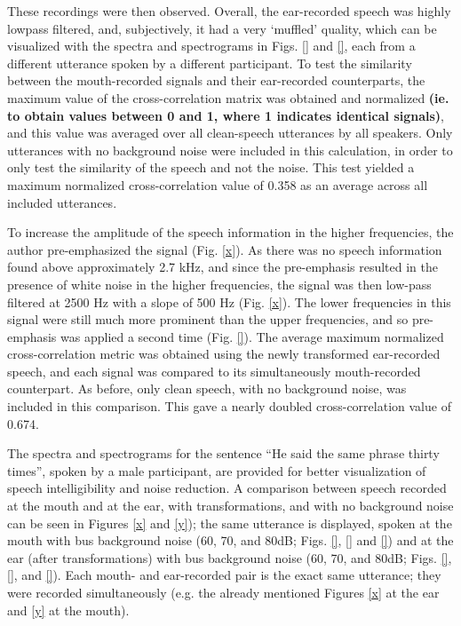 These recordings were then observed.  Overall, the ear-recorded speech was highly lowpass filtered, and, subjectively, it had a very `muffled' quality, which can be visualized with the spectra and spectrograms in Figs. \ref{} and \ref{}, each from a different utterance spoken by a different participant.  To test the similarity between the mouth-recorded signals and their ear-recorded counterparts, the maximum value of the cross-correlation matrix was obtained and normalized \textbf{(ie. to obtain values between 0 and 1, where 1 indicates identical signals)}, and this value was averaged over all clean-speech utterances by all speakers.  Only utterances with no background noise were included in this calculation, in order to only test the similarity of the speech and not the noise.  This test yielded a maximum normalized cross-correlation value of 0.358 as an average across all included utterances.

To increase the amplitude of the speech information in the higher frequencies, the author pre-emphasized the signal (Fig. \ref{x}).  As there was no speech information found above approximately 2.7 kHz, and since the pre-emphasis resulted in the presence of white noise in the higher frequencies, the signal was then low-pass filtered at 2500 Hz with a slope of 500 Hz (Fig. \ref{x}).  The lower frequencies in this signal were still much more prominent than the upper frequencies, and so pre-emphasis was applied a second time (Fig. \ref{}).  The average maximum normalized cross-correlation metric was obtained using the newly transformed ear-recorded speech, and each signal was compared to its simultaneously mouth-recorded counterpart.  As before, only clean speech, with no background noise, was included in this comparison.  This gave a nearly doubled cross-correlation value of 0.674.

The spectra and spectrograms for the sentence ``He said the same phrase thirty times'', spoken by a male participant, are provided for better visualization of speech intelligibility and noise reduction.  A comparison between speech recorded at the mouth and at the ear, with transformations, and with no background noise can be seen in Figures \ref{x} and \ref{y}); the same utterance is displayed, spoken at the mouth with bus background noise (60, 70, and 80dB; Figs. \ref{}, \ref{} and \ref{}) and at the ear (after transformations) with bus background noise (60, 70, and 80dB; Figs. \ref{}, \ref{}, and \ref{}).  Each mouth- and ear-recorded pair is the exact same utterance; they were recorded simultaneously (e.g. the already mentioned Figures \ref{x} at the ear and \ref{y} at the mouth).

